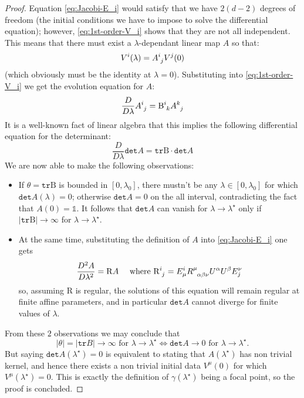 \begin{proof}
		Equation \eqref{eq:Jacobi-E_i} would satisfy that we have \(2(d - 2)\) degrees of freedom (the initial conditions we have to impose to solve the differential equation); however, \eqref{eq:1st-order-V_i} shows that they are not all independent. This means that there must exist a \(\lambda\)-dependant linear map \(A\) so that:
		\[
		V^i(\lambda) = A\indices{^i_j}V^j(0)
		\]
		(which obviously must be the identity at \(\lambda = 0\)). 
		Substituting into \eqref{eq:1st-order-V_i} we get the evolution equation for \(A\):
		\[
		\frac{D}{D\lambda}A\indices{^i_j} = \mathrm{B}\indices{^i_k}A\indices{^k_j}
		\]
		It is a well-known fact of linear algebra that this implies the following differential equation for the determinant: %
		\begin{equation}
		\label{eq;det-A}
			\frac{D}{D\lambda}\texttt{det}A = \texttt{tr}\mathrm{B}\cdot \texttt{det}A 
		\end{equation}
		We are now able to make the following observations:
		\begin{itemize}
			\item[\ding{99}] If \(\theta = \texttt{tr}\mathrm{B}\) is bounded in \([0, \lambda_0]\), there mustn't be any \(\lambda \in [0, \lambda_0]\) for which \(\texttt{det}A(\lambda) = 0\); otherwise \(\texttt{det}A = 0\) on the all interval, contradicting the fact that \(A(0) = \mathbb{1}\). It follows that \(\texttt{det}A\) can vanish for \(\lambda \rightarrow \lambda^{\star}\) only if \(\vert\texttt{tr}\mathrm{B}\vert \rightarrow \infty\) for \(\lambda \rightarrow \lambda^{\star}\).
			\item[\ding{99}] At the same time, substituting the definition of \(A\) into \eqref{eq:Jacobi-E_i} one gets
			\[
			\frac{D^2 A}{D\lambda^2} = \mathrm{R}A \quad \text{ where } \mathrm{R}\indices{^i_j} = E^i_{\mu}R\indices{^{\mu}_{\alpha\beta\nu}}U^{\alpha}U^{\beta}E_j^{\nu}
			\]
			so, assuming \(\mathrm{R}\) is regular, the solutions of this equation will remain regular at finite affine parameters, and in particular \(\texttt{det}A\) cannot diverge for finite values of \(\lambda\). 
		\end{itemize}
		From these \(2\) observations we may conclude that
		\[
		\vert\theta\vert = \vert\texttt{tr}B\vert \rightarrow \infty \text{ for } \lambda \rightarrow \lambda^{\star}\iff \texttt{det}A \rightarrow 0 \text{ for } \lambda \rightarrow \lambda^{\star}.
		\]
		But saying \(\texttt{det}A(\lambda^{\star}) = 0 \) is equivalent to stating that \(A(\lambda^{\star}) \) has non trivial kernel, and hence there exists a non trivial initial data \(V^{\mu}(0)\) for which \(V^{\mu}(\lambda^{\star}) = 0\). This is exactly the definition of \(\gamma(\lambda^{\star})\) being a focal point, so the proof is concluded.
	\end{proof}

